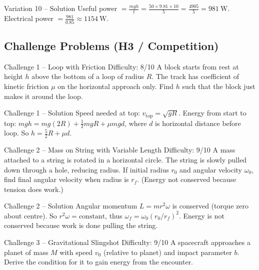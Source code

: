 \documentclass[11pt]{beamer}
\begin{document}
\begin{frame}{Variation 10 – Solution}
Useful power $= \frac{mgh}{t} = \frac{50\times9.81\times10}{5} = \frac{4905}{5} = 981\ \mathrm{W}$.
Electrical power $= \frac{981}{0.85} \approx 1154\ \mathrm{W}$.
\end{frame}

\subsection{Challenge Problems (H3 / Competition)}

\begin{frame}[shrink=15]{Challenge 1 – Loop with Friction \hfill Difficulty: 8/10}
A block starts from rest at height $h$ above the bottom of a loop of radius $R$. The track has coefficient of kinetic friction $\mu$ on the horizontal approach only. Find $h$ such that the block just makes it around the loop.
\end{frame}

\begin{frame}{Challenge 1 – Solution}
Speed needed at top: $v_{\text{top}} = \sqrt{gR}$. Energy from start to top: $mgh = mg(2R) + \frac12 m gR + \mu mg d$, where $d$ is horizontal distance before loop. So $h = \frac52 R + \mu d$.
\end{frame}

\begin{frame}[shrink=15]{Challenge 2 – Mass on String with Variable Length \hfill Difficulty: 9/10}
A mass attached to a string is rotated in a horizontal circle. The string is slowly pulled down through a hole, reducing radius. If initial radius $r_0$ and angular velocity $\omega_0$, find final angular velocity when radius is $r_f$. (Energy not conserved because tension does work.)
\end{frame}

\begin{frame}{Challenge 2 – Solution}
Angular momentum $L = m r^2 \omega$ is conserved (torque zero about centre). So $r^2 \omega = \text{constant}$, thus $\omega_f = \omega_0 (r_0/r_f)^2$. Energy is not conserved because work is done pulling the string.
\end{frame}

\begin{frame}[shrink=15]{Challenge 3 – Gravitational Slingshot \hfill Difficulty: 9/10}
A spacecraft approaches a planet of mass $M$ with speed $v_0$ (relative to planet) and impact parameter $b$. Derive the condition for it to gain energy from the encounter.
\end{frame}
\end{document}
